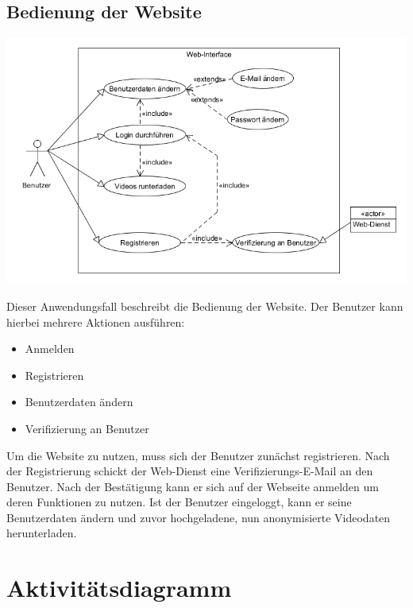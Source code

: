 \subsection{Bedienung der Website}
\begin{center}
\includegraphics[width=1\textwidth]{subtopicsFuncspec/Res/systemModels/WebsiteAWFDiagram.png}
\end{center}	
Dieser Anwendungsfall beschreibt die Bedienung der Website.
Der Benutzer kann hierbei mehrere Aktionen ausführen:
\begin{itemize}
\itemsep0pt
\item Anmelden
\item Registrieren
\item Benutzerdaten ändern
\item Verifizierung an Benutzer
\end{itemize}
Um die Website zu nutzen, muss sich der Benutzer zunächst registrieren. Nach der Registrierung schickt der \gls{Web-Dienst} eine Verifizierungs-\gls{E-Mail} an den Benutzer. Nach der Bestätigung kann er sich auf der Webseite anmelden um deren Funktionen zu nutzen. Ist der Benutzer eingeloggt, kann er seine Benutzerdaten ändern und zuvor hochgeladene, nun anonymisierte Videodaten herunterladen.

\section{Aktivitätsdiagramm}
